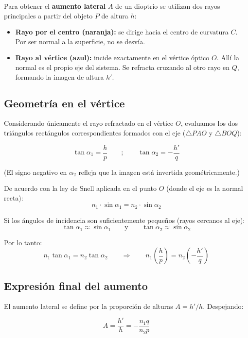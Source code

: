\documentclass[12pt, a4paper]{article}
\theoremstyle{definition}
\begin{document}
Para obtener el \textbf{aumento lateral} \(A\) de un dioptrio se utilizan dos rayos
principales a partir del objeto \(P\) de altura \(h\):

\begin{itemize}
  \item \textbf{Rayo por el centro (naranja):} se dirige hacia el centro de curvatura
        \(C\). Por ser normal a la superficie, no se desvía.
  \item \textbf{Rayo al vértice (azul):} incide exactamente en el vértice óptico \(O\).
        Allí la normal es el propio eje del sistema. Se refracta cruzando al otro rayo en
        \(Q\), formando la imagen de altura \(h'\).
\end{itemize}

\subsection{Geometría en el vértice}

Considerando únicamente el rayo refractado en el vértice \(O\), evaluamos los dos
triángulos rectángulos correspondientes formados con el eje (\(\triangle PAO\) y
\(\triangle BOQ\)):

\[
  \tan\alpha_1 = \frac{h}{p} \qquad;\qquad \tan\alpha_2 = -\frac{h'}{q}
\]

(El signo negativo en \(\alpha_2\) refleja que la imagen está invertida geométricamente.)

De acuerdo con la ley de Snell aplicada en el punto \(O\) (donde el eje es la normal
recta):
\[
  n_1 \cdot \sin\alpha_1 = n_2 \cdot \sin\alpha_2
\]

Si los ángulos de incidencia son suficientemente pequeños (rayos cercanos al eje):
\[
  \tan\alpha_1 \approx \sin\alpha_1 \qquad\text{y}\qquad \tan\alpha_2 \approx \sin\alpha_2
\]

Por lo tanto:
\[
  n_1 \tan\alpha_1 = n_2 \tan\alpha_2 \qquad\Longrightarrow\qquad
  n_1 \left(\frac{h}{p}\right) = n_2 \left(-\frac{h'}{q}\right)
\]

\subsection{Expresión final del aumento}

El aumento lateral se define por la proporción de alturas \(A = h'/h\). Despejando:

\begin{equation}
  \boxed{A = \frac{h'}{h} = -\frac{n_1 q}{n_2 p}}
  \label{eq:aumento}
\end{equation}
\end{document}
